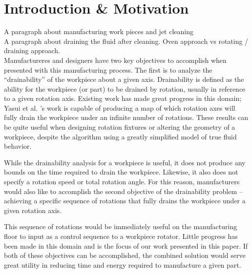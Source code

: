 							\chapter{Introduction \& Motivation}

A paragraph about manufacturing work pieces and jet cleaning
\\

A paragraph about draining the fluid after cleaning. Oven approach vs rotating / draining approach.
\\

Manufactureres and designers have two key objectives to accomplish when presented with this manufacturing process. The first is to analyze the ``drainability'' of the workpiece about a given axis. Drainability is defined as the ability for the workpiece (or part) to be drained by rotation, usually in reference to a given rotation axis. Existing work has made great progress in this domain; Yasui et al. \cite{plot}'s work is capable of producing a map of which rotation axes will fully drain the workpiece under an infinite number of rotations. These results can be quite useful when designing rotation fixtures or altering the geometry of a workpiece, despite the algorithm using a greatly simplified model of true fluid behavior.

While the drainability analysis for a workpiece is useful, it does not produce any bounds on the time required to drain the workpiece. Likewise, it also does not specify a rotation speed or total rotation angle. For this reason, manufacturers would also like to accomplish the second objective of the drainability problem -- achieving a specific sequence of rotations that fully drains the workpiece under a given rotation axis.

This sequence of rotations would be immediately useful on the manufacturing floor to input as a control sequence to a workpiece rotator. Little progress has been made in this domain and is the focus of our work presented in this paper. If both of these objectives can be accomplished, the combined solution would serve great utility in reducing time and energy required to manufacture a given part.

